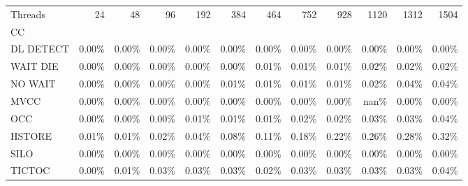\begin{tabular}{lrrrrrrrrrrr}
\toprule
Threads &  24   &  48   &  96   &  192  &  384  &  464  &  752  &  928  &  1120 &  1312 &  1504 \\
CC        &       &       &       &       &       &       &       &       &       &       &       \\
\midrule
DL DETECT & 0.00\% & 0.00\% & 0.00\% & 0.00\% & 0.00\% & 0.00\% & 0.00\% & 0.00\% & 0.00\% & 0.00\% & 0.00\% \\
WAIT DIE  & 0.00\% & 0.00\% & 0.00\% & 0.00\% & 0.00\% & 0.01\% & 0.01\% & 0.01\% & 0.02\% & 0.02\% & 0.02\% \\
NO WAIT   & 0.00\% & 0.00\% & 0.00\% & 0.00\% & 0.01\% & 0.01\% & 0.01\% & 0.01\% & 0.02\% & 0.04\% & 0.04\% \\
MVCC      & 0.00\% & 0.00\% & 0.00\% & 0.00\% & 0.00\% & 0.00\% & 0.00\% & 0.00\% &  nan\% & 0.00\% & 0.00\% \\
OCC       & 0.00\% & 0.00\% & 0.00\% & 0.01\% & 0.01\% & 0.01\% & 0.02\% & 0.02\% & 0.03\% & 0.03\% & 0.04\% \\
HSTORE    & 0.01\% & 0.01\% & 0.02\% & 0.04\% & 0.08\% & 0.11\% & 0.18\% & 0.22\% & 0.26\% & 0.28\% & 0.32\% \\
SILO      & 0.00\% & 0.00\% & 0.00\% & 0.00\% & 0.00\% & 0.00\% & 0.00\% & 0.00\% & 0.00\% & 0.00\% & 0.00\% \\
TICTOC    & 0.00\% & 0.01\% & 0.03\% & 0.03\% & 0.03\% & 0.02\% & 0.03\% & 0.03\% & 0.03\% & 0.03\% & 0.04\% \\
\bottomrule
\end{tabular}
